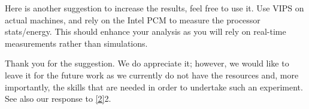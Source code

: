 \begin{reviewer}
Here is another suggestion to increase the results, feel free to use it. Use
VIPS on actual machines, and rely on the Intel PCM to measure the processor
stats/energy. This should enhance your analysis as you will rely on real-time
measurements rather than simulations.
\end{reviewer}

\begin{authors}
Thank you for the suggestion. We do appreciate it; however, we would like to
leave it for the future work as we currently do not have the resources and, more
importantly, the skills that are needed in order to undertake such an
experiment. See also our response to \cref{2}{2}.
\end{authors}
